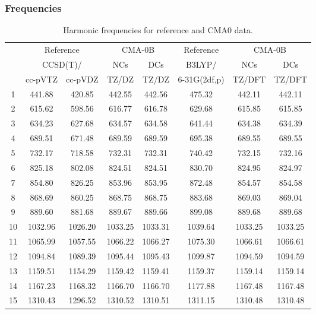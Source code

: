 \documentclass[10pt,oneside]{article}
\begin{document}
\subsubsection*{Frequencies}
\begin{table}[h!]
\centering
\caption{Harmonic frequencies for reference and CMA0 data.}
\begin{tabular}{cccccccc}
\toprule
{} & \multicolumn{2}{c}{Reference} & \multicolumn{2}{c}{CMA-0B} &    Reference & \multicolumn{2}{c}{CMA-0B} \\
{} & \multicolumn{2}{c}{CCSD(T)/} &     NCs &     DCs &       B3LYP/ &     NCs &     DCs \\
{} &   cc-pVTZ & cc-pVDZ &   TZ/DZ &   TZ/DZ & 6-31G(2df,p) &  TZ/DFT &  TZ/DFT \\
\midrule
1  &    441.88 &  420.85 &  442.55 &  442.56 &       475.32 &  442.11 &  442.11 \\
2  &    615.62 &  598.56 &  616.77 &  616.78 &       629.68 &  615.85 &  615.85 \\
3  &    634.23 &  627.68 &  634.57 &  634.58 &       641.44 &  634.38 &  634.39 \\
4  &    689.51 &  671.48 &  689.59 &  689.59 &       695.38 &  689.55 &  689.55 \\
5  &    732.17 &  718.58 &  732.31 &  732.31 &       740.42 &  732.15 &  732.16 \\
6  &    825.18 &  802.08 &  824.51 &  824.51 &       830.70 &  824.95 &  824.97 \\
7  &    854.80 &  826.25 &  853.96 &  853.95 &       872.48 &  854.57 &  854.58 \\
8  &    868.69 &  860.25 &  868.75 &  868.75 &       883.68 &  869.03 &  869.04 \\
9  &    889.60 &  881.68 &  889.67 &  889.66 &       899.08 &  889.68 &  889.68 \\
10 &   1032.96 & 1026.20 & 1033.25 & 1033.31 &      1039.64 & 1033.25 & 1033.25 \\
11 &   1065.99 & 1057.55 & 1066.22 & 1066.27 &      1075.30 & 1066.61 & 1066.61 \\
12 &   1094.84 & 1089.39 & 1095.44 & 1095.43 &      1099.87 & 1094.59 & 1094.59 \\
13 &   1159.51 & 1154.29 & 1159.42 & 1159.41 &      1159.37 & 1159.14 & 1159.14 \\
14 &   1167.23 & 1168.32 & 1166.70 & 1166.70 &      1177.88 & 1167.48 & 1167.48 \\
15 &   1310.43 & 1296.52 & 1310.52 & 1310.51 &      1311.15 & 1310.48 & 1310.48 \\

\end{tabular}
\end{table}
\end{document}
